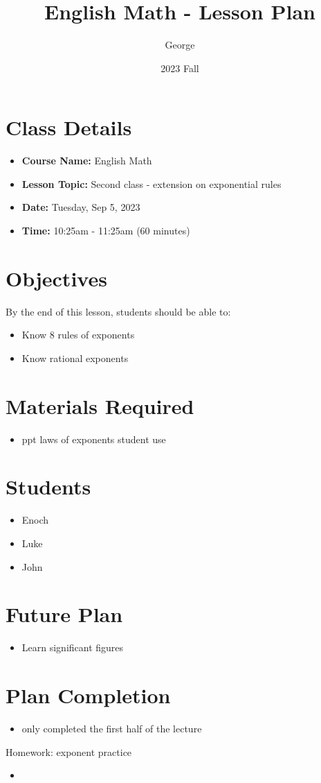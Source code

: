 \documentclass[12pt]{article}
\title{English Math - Lesson Plan}
\author{George}
\date{2023 Fall}
\begin{document}
\maketitle

\section{Class Details}
\begin{itemize}
    \item \textbf{Course Name:} English Math
    \item \textbf{Lesson Topic:}  Second class - extension on exponential rules
    \item \textbf{Date:} Tuesday, Sep 5, 2023
    \item \textbf{Time:} 10:25am - 11:25am (60 minutes)
\end{itemize}

\section{Objectives}
By the end of this lesson, students should be able to:
\begin{itemize}
    \item Know 8 rules of exponents
    \item Know rational exponents

\end{itemize}

\section{Materials Required}
\begin{itemize}
   
    \item ppt laws of exponents student use

  
\end{itemize}


\section{Students}
\begin{itemize}
    \item Enoch
    \item Luke
    \item John

\end{itemize}


\section{Future Plan}
\begin{itemize}
    \item Learn significant figures

\end{itemize}
\section{Plan Completion}
\begin{itemize}
    \item only completed the first half of the lecture
\end{itemize}
Homework: exponent practice
\begin{itemize}
    \item 
\end{itemize}
\end{document}

